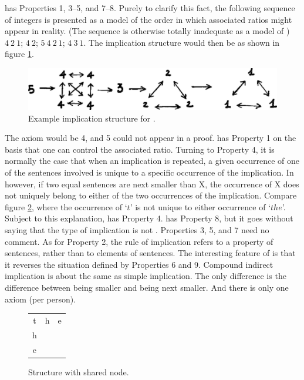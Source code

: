  has Properties 1, 3--5, and 7--8. Purely to clarify this fact, the 
following sequence of integers is presented as a model of the order in which 
associated ratios might appear in reality. (The sequence is otherwise totally 
inadequate as a model of ) $4\medspace2\medspace1$; $4\medspace2$; $5\medspace4\medspace2\medspace1$; $4\medspace3\medspace1$. The 
implication structure would then be as shown in figure \ref{illusionstructure}.

\begin{figure}
	{\centering \includegraphics[width=4.5in]{img/illusionstructure} \par}
	\caption{Example implication structure for .}
	\label{illusionstructure}
\end{figure}

The axiom would be 4, and 5 could not appear in a proof.  has 
Property 1 on the basis that one can control the associated ratio. Turning to 
Property 4, it is normally the case that when an implication is repeated, a 
given occurrence of one of the sentences involved is unique to a specific 
occurrence of the implication. In  however, if two equal 
sentences are next smaller than X, the occurrence of X does not uniquely 
belong to either of the two occurrences of the implication. Compare figure \ref{thestructure},
where the occurrence of `$t$' is not unique to either occurrence of `$the$'. 
Subject to this explanation,  has Property 4.  has 
Property 8, but it goes without saying that the type of implication is not 
. Properties 3, 5, and 7 need no comment. As for Property 2, 
the rule of implication refers to a property of sentences, rather than to 
elements of sentences. The interesting feature of  is that it 
reverses the situation defined by Properties 6 and 9. Compound indirect 
implication is about the same as simple implication. The only difference is 
the difference between being smaller and being next smaller. And there is 
only one axiom (per person). 

\begin{figure}
	{\centering \setlength\tabcolsep{0.25em}
	\begin{tabular}{c c c} t & h & e \\ h &   &   \\ e &   & \end{tabular} \par}
	\caption{Structure with shared node.}
	\label{thestructure}
\end{figure}


